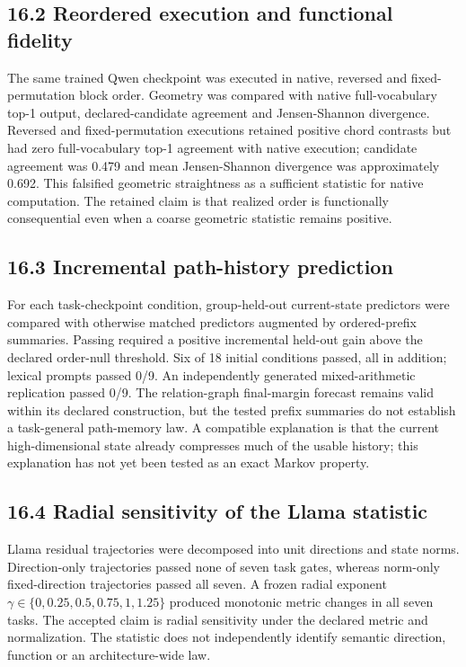 \documentclass[10pt]{article}
\begin{document}
\subsection*{16.2 Reordered execution and functional fidelity}

The same trained Qwen checkpoint was executed in native, reversed and fixed-permutation block order. Geometry was compared with native full-vocabulary top-1 output, declared-candidate agreement and Jensen-Shannon divergence. Reversed and fixed-permutation executions retained positive chord contrasts but had zero full-vocabulary top-1 agreement with native execution; candidate agreement was 0.479 and mean Jensen-Shannon divergence was approximately 0.692. This falsified geometric straightness as a sufficient statistic for native computation. The retained claim is that realized order is functionally consequential even when a coarse geometric statistic remains positive.

\subsection*{16.3 Incremental path-history prediction}

For each task-checkpoint condition, group-held-out current-state predictors were compared with otherwise matched predictors augmented by ordered-prefix summaries. Passing required a positive incremental held-out gain above the declared order-null threshold. Six of 18 initial conditions passed, all in addition; lexical prompts passed 0/9. An independently generated mixed-arithmetic replication passed 0/9. The relation-graph final-margin forecast remains valid within its declared construction, but the tested prefix summaries do not establish a task-general path-memory law. A compatible explanation is that the current high-dimensional state already compresses much of the usable history; this explanation has not yet been tested as an exact Markov property.

\subsection*{16.4 Radial sensitivity of the Llama statistic}

Llama residual trajectories were decomposed into unit directions and state norms. Direction-only trajectories passed none of seven task gates, whereas norm-only fixed-direction trajectories passed all seven. A frozen radial exponent \(\gamma\in\{0,0.25,0.5,0.75,1,1.25\}\) produced monotonic metric changes in all seven tasks. The accepted claim is radial sensitivity under the declared metric and normalization. The statistic does not independently identify semantic direction, function or an architecture-wide law.
\end{document}
